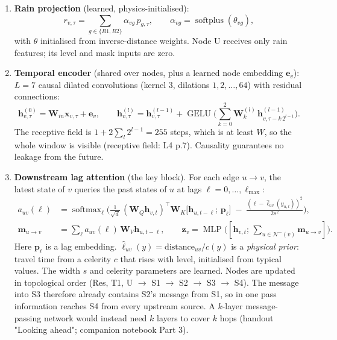 \documentclass[11pt]{article}
\begin{document}
\begin{enumerate}[label=(\alph*)]
\item \textbf{Rain projection} (learned, physics-initialised):
\[ r_{v,\tau} = \sum_{g\in\{R1,R2\}} \alpha_{vg}\,p_{g,\tau}, \qquad \alpha_{vg}=\operatorname{softplus}(\theta_{vg}), \]
with $\theta$ initialised from inverse-distance weights. Node U receives only rain features; its level and mask inputs are zero.

\item \textbf{Temporal encoder} (shared over nodes, plus a learned node embedding $\mathbf{e}_v$): $L=7$ causal dilated convolutions (kernel 3, dilations $1,2,\dots,64$) with residual connections:
\[ \mathbf{h}^{(0)}_{v,\tau}=\mathbf{W}_{in}\mathbf{x}_{v,\tau}+\mathbf{e}_v,\qquad
\mathbf{h}^{(l)}_{v,\tau}=\mathbf{h}^{(l-1)}_{v,\tau}+\operatorname{GELU}\Big(\sum_{k=0}^{2}\mathbf{W}^{(l)}_k\,\mathbf{h}^{(l-1)}_{v,\tau-k\,2^{l-1}}\Big). \]
The receptive field is $1+2\sum_l 2^{l-1}=255$ steps, which is at least $W$, so the whole window is visible (receptive field: L4 p.7). Causality guarantees no leakage from the future.

\item \textbf{Downstream lag attention} (the key block). For each edge $u\to v$, the latest state of $v$ queries the past states of $u$ at lags $\ell=0,\dots,\ell_{\max}$:
\begin{align*}
a_{uv}(\ell) &= \operatorname{softmax}_\ell\Big(\tfrac{1}{\sqrt d}\,(\mathbf{W}_Q \mathbf{h}_{v,t})^{\!\top}\mathbf{W}_K\big[\mathbf{h}_{u,t-\ell};\,\mathbf{p}_\ell\big] \;-\; \tfrac{(\ell-\hat\ell_{uv}(y_{u,t}))^2}{2s^2}\Big),\\
\mathbf{m}_{u\to v} &= \textstyle\sum_\ell a_{uv}(\ell)\,\mathbf{W}_V \mathbf{h}_{u,t-\ell}, \qquad
\mathbf{z}_v = \operatorname{MLP}\big([\mathbf{h}_{v,t};\,\textstyle\sum_{u\in\mathcal N^-(v)}\mathbf{m}_{u\to v}]\big).
\end{align*}
Here $\mathbf{p}_\ell$ is a lag embedding. $\hat\ell_{uv}(y)=\text{distance}_{uv}/c(y)$ is a \emph{physical prior}: travel time from a celerity $c$ that rises with level, initialised from typical values. The width $s$ and celerity parameters are learned.
Nodes are updated in topological order (Res, T1, U $\to$ S1 $\to$ S2 $\to$ S3 $\to$ S4). The message into S3 therefore already contains S2's message from S1, so in one pass information reaches S4 from every upstream source. A $k$-layer message-passing network would instead need $k$ layers to cover $k$ hops (handout "Looking ahead"; companion notebook Part 3).


\end{enumerate}
\end{document}
